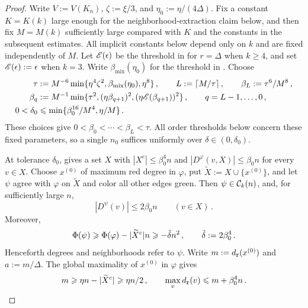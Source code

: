 \begin{proof}
Write $V:=V(K_n)$, $\zeta:=\xi/3$, and $\eta_0:=\eta/(4\Delta)$. Fix a constant $K=K(k)$ large enough for the neighborhood-extraction claim below, and then fix $M=M(k)$ sufficiently large compared with $K$ and the constants in the subsequent estimates. All implicit constants below depend only on $k$ and are fixed independently of $M$. Let ${\mathscr E}(\epsilon)$ be the threshold in  for $r=\Delta$ when $k\geq4$, and set ${\mathscr E}(\epsilon):=\epsilon$ when $k=3$. Write $\beta_{\mathrm{mix}}(\eta_0)$ for the threshold in . Choose
\begin{align}
\tau&:=M^{-6}\min\{\eta^4\zeta^2,\beta_{\mathrm{mix}}(\eta_0),\eta^8\}\,,\qquad L:=\lceil M/\tau\rceil\,,\qquad \beta_L:=\tau^6/M^8\,,\label{eq:betaL}\\
\beta_q&:=M^{-1}\min\{\tau^2,(\eta\beta_{q+1})^2,(\eta{\mathscr E}(\beta_{q+1}))^2\}\,,\qquad q=L-1,\dots,0\,,\label{eq:betaq}\\
0<\delta_0&\leqslant\min\{\beta_0^{16}/M^4,\eta/M\}\,.\label{eq:delta-small}
\end{align}
These choices give $0<\beta_0<\cdots<\beta_L<\tau$. All order thresholds below concern these fixed parameters, so a single $n_0$ suffices uniformly over $\delta\in(0,\delta_0)$.

At tolerance $\delta_0$,  gives a set $X$ with $|X^c|\leq\beta_0^4n$ and $|D^\varphi(v,X)|\leq\beta_0n$ for every $v\in X$. Choose $x^{(0)}$ of maximum red degree in $\varphi$, put $\widetilde X:=X\cup\{x^{(0)}\}$, and let $\psi$ agree with $\varphi$ on $\widetilde X$ and color all other edges green. Then $\psi\in{\mathcal C}_k(n)$, and, for sufficiently large $n$,
\begin{equation}\label{eqn:vpr-deg-control}
|D^\psi(v)|\leq2\beta_0n\qquad(v\in X)\,.
\end{equation}
Moreover,
\begin{equation}\label{eq:psi-near-extremal}
\Phi(\psi)\geqslant\Phi(\varphi)-|\widetilde X^c|n\geqslant-\tilde{\delta} n^2\,,\qquad \tilde{\delta}:=2\beta_0^4\,.
\end{equation}
Henceforth degrees and neighborhoods refer to $\psi$. Write $m:=d_{\normalfont\texttt r}(x^{(0)})$ and $a:=m/\Delta$. The global maximality of $x^{(0)}$ in $\varphi$ gives
$$m\geqslant\eta n-|\widetilde X^c|\geqslant\eta n/2\,,\qquad \max_vd_{\normalfont\texttt r}(v)\leqslant m+\beta_0^4n\,.$$


\end{proof}
